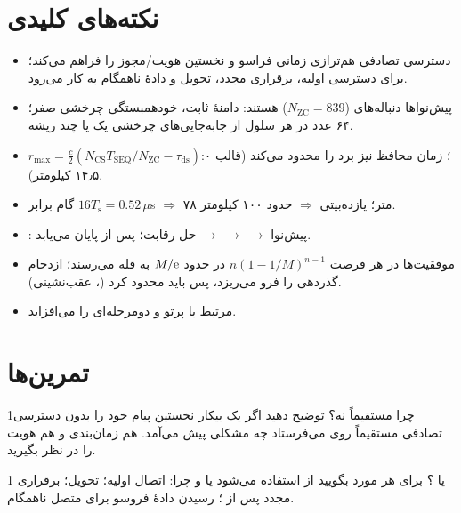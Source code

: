 \documentclass[11pt,a4paper]{article}
\begin{document}
\section{نکته‌های کلیدی}
\begin{takeawaybox}
\begin{itemize}
  \item دسترسی تصادفی هم‌ترازی زمانی فراسو و نخستین هویت/مجوز را فراهم می‌کند؛ برای دسترسی اولیه، برقراری مجدد،
        تحویل و دادهٔ ناهمگام به کار می‌رود.
  \item پیش‌نواها دنباله‌های  ($N_{\mathrm{ZC}} = 839$) هستند: دامنهٔ ثابت، خودهمبستگی چرخشی صفر؛ ۶۴ عدد در هر
        سلول از جابه‌جایی‌های چرخشی یک یا چند ریشه.
  \item $r_{\max} = \tfrac{c}{2}(N_{\mathrm{CS}}T_{\mathrm{SEQ}}/N_{\mathrm{ZC}} - \tau_{\mathrm{ds}})$؛ زمان محافظ نیز برد را محدود
        می‌کند (قالب ۰: ۱۴٫۵ کیلومتر).
  \item گام  برابر $16T_\mathrm{s} = 0.52\,\mu$s $\Rightarrow$ ۷۸ متر؛  یازده‌بیتی  $\Rightarrow$ حدود ۱۰۰ کیلومتر.
  \item {}: پیش‌نوا $\to$  $\to$  $\to$ حل رقابت؛  پس از  پایان می‌یابد.
  \item موفقیت‌ها در هر فرصت $n(1-1/M)^{n-1}$ در حدود $M/\mathrm{e}$ به قله می‌رسند؛ ازدحام گذردهی را فرو می‌ریزد، پس باید
        محدود کرد (، عقب‌نشینی).
  \item {}  مرتبط با پرتو و  دومرحله‌ای را می‌افزاید.
\end{itemize}
\end{takeawaybox}

\section{تمرین‌ها}

\begin{exercisebox}{1}{چرا مستقیماً  نه؟}\label{exr:why}
توضیح دهید اگر یک  بیکار نخستین پیام خود را بدون دسترسی تصادفی مستقیماً روی  می‌فرستاد چه
مشکلی پیش می‌آمد. هم زمان‌بندی و هم هویت را در نظر بگیرید.
\end{exercisebox}

\begin{exercisebox}{1}{ یا ؟}\label{exr:which}
برای هر مورد بگویید از  استفاده می‌شود یا  و چرا: اتصال اولیه؛ تحویل؛ برقراری مجدد 
پس از ؛ رسیدن دادهٔ فروسو برای  متصل ناهمگام.
\end{exercisebox}
\end{document}
